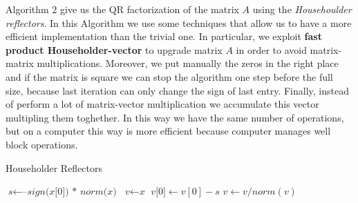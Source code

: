 \documentclass{article}
\begin{document}
Algorithm 2 give us the QR factorization of the matrix $A$ using the \textit{Househoulder reflectors}. In this Algorithm we use some techniques that allow us to have a more efficient implementation than the trivial one. In particular, we exploit \textbf{fast product Householder-vector} to upgrade matrix $A$ in order to avoid matrix-matrix multiplications. Moreover, we put manually the zeros in the right place and if the matrix is square we can stop the algorithm one step before the full size, because last iteration can only change the sign of last entry. Finally, instead of perform a lot of matrix-vector multiplication we accumulate this vector multipling them toghether. In this way we have the same number of operations, but on a computer this way is more efficient because computer manages well block operations.
\makeatletter
\def\BState{\State\hskip-\ALG@thistlm}
\makeatother
\begin{algorithm}
\caption{Householder Reflectors}\label{euclid}
\begin{algorithmic}[1]
\State $\textit{s} \gets \textit{--sign(x[0]) * norm(x)}$
\State $\textit{v} \gets \textit{x}$
\State $\textit{v[0]} \gets \textit{$v[0] - s$}$
\State $\textit{v} \gets \textit{$v / norm(v)$}$
\EndFunction
\end{algorithmic}
\end{algorithm}
\end{document}
